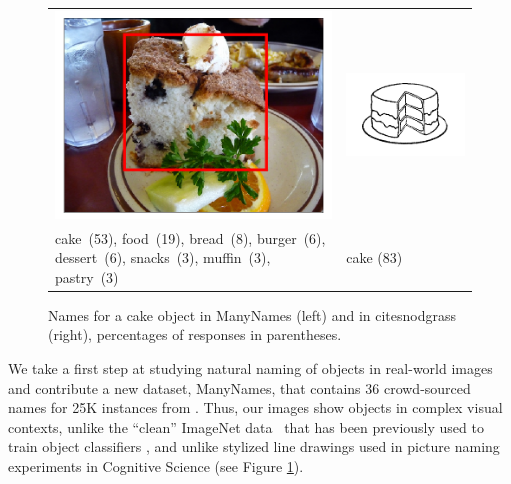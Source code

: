 \begin{figure}[tbp]
\scriptsize
\begin{tabular}{p{4.3cm}p{2cm}}
\centering
\includegraphics[scale=0.15]{figures/2390077_1254219_supercat_unique.png} &
\includegraphics[scale=0.4]{figures/snodgrass_vanderwart_cake_042.png}\\
 cake\ (53),  food\ (19), bread\ (8), burger\ (6), dessert\ (6), snacks\ (3), muffin\ (3),  pastry\ (3) & \hspace{.9cm} cake (83)
\end{tabular}
\caption{Names for a cake object in ManyNames (left) and in cite{snodgrass} (right), percentages of responses in parentheses.}
\label{fig:cake}
\end{figure}


We take a first step at studying natural naming of objects in real-world images and contribute a new dataset, ManyNames, that contains 36 crowd-sourced names for 25K instances from \vg.
Thus, our images show objects in complex visual contexts,
unlike the ``clean'' ImageNet data~\cite{imagenet_cvpr09} that has been previously used to train object classifiers \cite{ILSVRC15}, and unlike stylized line drawings used in picture naming experiments in Cognitive Science (see Figure \ref{fig:cake}).

